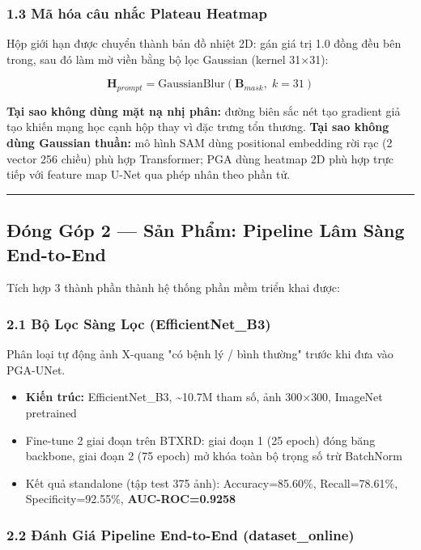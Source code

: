 \subsubsection{1.3 Mã hóa câu nhắc Plateau Heatmap}

Hộp giới hạn được chuyển thành bản đồ nhiệt 2D: gán giá trị 1.0 đồng đều bên trong, sau đó làm mờ viền bằng bộ lọc Gaussian (kernel 31$\times$31):

\[
\mathbf{H}_{prompt} = \text{GaussianBlur}(\mathbf{B}_{mask},\; k=31)
\]

\textbf{Tại sao không dùng mặt nạ nhị phân:} đường biên sắc nét tạo gradient giả tạo khiến mạng học cạnh hộp thay vì đặc trưng tổn thương.  
\textbf{Tại sao không dùng Gaussian thuần:} mô hình SAM dùng positional embedding rời rạc (2 vector 256 chiều) phù hợp Transformer; PGA dùng heatmap 2D phù hợp trực tiếp với feature map U-Net qua phép nhân theo phần tử.

\vspace{0.5em}\hrule\vspace{0.5em}


\subsection{Đóng Góp 2 — Sản Phẩm: Pipeline Lâm Sàng End-to-End}

Tích hợp 3 thành phần thành hệ thống phần mềm triển khai được:


\subsubsection{2.1 Bộ Lọc Sàng Lọc (EfficientNet\_B3)}

Phân loại tự động ảnh X-quang "có bệnh lý / bình thường" trước khi đưa vào PGA-UNet.

\begin{itemize}
  \item \textbf{Kiến trúc:} EfficientNet\_B3, \textasciitilde{}10.7M tham số, ảnh 300$\times$300, ImageNet pretrained
  \item Fine-tune 2 giai đoạn trên BTXRD: giai đoạn 1 (25 epoch) đóng băng backbone, giai đoạn 2 (75 epoch) mở khóa toàn bộ trọng số trừ BatchNorm
  \item Kết quả standalone (tập test 375 ảnh): Accuracy=85.60\%, Recall=78.61\%, Specificity=92.55\%, \textbf{AUC-ROC=0.9258}
\end{itemize}


\subsubsection{2.2 Đánh Giá Pipeline End-to-End (dataset\_online)}

